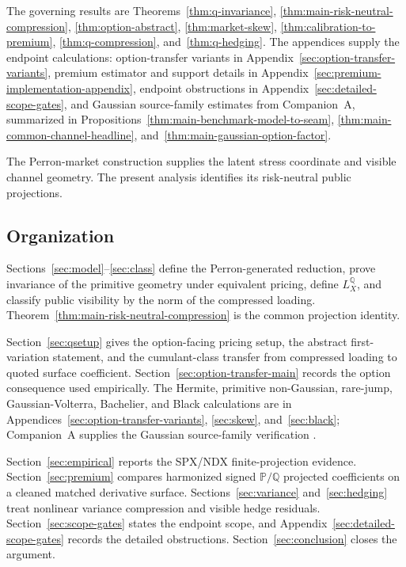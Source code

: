 \documentclass[11pt,a4paper]{amsart}
\theoremstyle{plain}
\theoremstyle{definition}
\theoremstyle{remark}
\newcommand{\PP}{\mathbb{P}}
\newcommand{\QQ}{\mathbb{Q}}
\begin{document}
The governing results are Theorems~\ref{thm:q-invariance},
\ref{thm:main-risk-neutral-compression}, \ref{thm:option-abstract}, \ref{thm:market-skew},
\ref{thm:calibration-to-premium}, \ref{thm:q-compression}, and~\ref{thm:q-hedging}.  The appendices
supply the endpoint calculations: option-transfer variants in
Appendix~\ref{sec:option-transfer-variants}, premium estimator and support details in
Appendix~\ref{sec:premium-implementation-appendix}, endpoint obstructions in
Appendix~\ref{sec:detailed-scope-gates}, and Gaussian source-family estimates from Companion~A,
summarized in Propositions~\ref{thm:main-benchmark-model-to-seam},
\ref{thm:main-common-channel-headline}, and~\ref{thm:main-gaussian-option-factor}.

The Perron-market construction supplies the latent stress coordinate and visible channel geometry.
The present analysis identifies its risk-neutral public projections.

\subsection*{Organization}
Sections~\ref{sec:model}--\ref{sec:class} define the Perron-generated reduction, prove invariance
of the primitive geometry under equivalent pricing, define \(L_X^\QQ\), and classify public
visibility by the norm of the compressed loading.  Theorem~\ref{thm:main-risk-neutral-compression}
is the common projection identity.

Section~\ref{sec:qsetup} gives the option-facing pricing setup, the abstract first-variation
statement, and the cumulant-class transfer from compressed loading to quoted surface coefficient.
Section~\ref{sec:option-transfer-main} records the option consequence used empirically.  The
Hermite, primitive non-Gaussian, rare-jump, Gaussian-Volterra, Bachelier, and Black calculations are
in Appendices~\ref{sec:option-transfer-variants}, \ref{sec:skew}, and~\ref{sec:black}; Companion~A
supplies the Gaussian source-family verification \cite{vidal2026gaussianseams}.

Section~\ref{sec:empirical} reports the SPX/NDX finite-projection evidence.  Section~\ref{sec:premium}
compares harmonized signed \(\PP/\QQ\) projected coefficients on a cleaned matched derivative
surface.  Sections~\ref{sec:variance} and~\ref{sec:hedging} treat nonlinear variance compression
and visible hedge residuals.  Section~\ref{sec:scope-gates} states the endpoint scope, and
Appendix~\ref{sec:detailed-scope-gates} records the detailed obstructions.  Section~\ref{sec:conclusion}
closes the argument.
\end{document}
